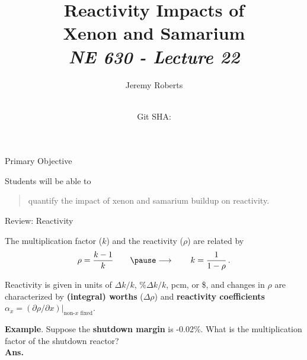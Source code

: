 \documentclass[aspectratio=1610]{beamer}
\title{Reactivity Impacts of \\Xenon and Samarium \\
       {\small\it NE 630 - Lecture 22}}
\date{ \\ {\footnotesize Git SHA: }}
\author{Jeremy Roberts}
\begin{document}
\begin{frame}
\titlepage
\end{frame}
 
 
\begin{frame}{Primary Objective}

Students will be able to 

\vfill

\begin{quote}
\textcolor{wcprimary}{quantify the impact of xenon and samarium buildup on reactivity.
}
\end{quote}

\vfill 

\end{frame}

\begin{frame}[fragile]{Review: Reactivity}
 
The multiplication factor ($k$) and the reactivity ($\rho$)
are related by
\begin{equation*}
  \rho = \frac{k - 1}{k} \qquad \pause \longrightarrow \qquad
  k =  \frac{1}{1-\rho} \, .
\end{equation*}

\vfill 
\pause 

Reactivity is given in units of $\Delta k/k$,  $\%\Delta k/k$, pcm, or \$,
and changes in $\rho$ are characterized by {\bf (integral) worths}  ($\Delta \rho$)
and {\bf reactivity coefficients} $\alpha_x = (\partial \rho/\partial x)|_{\text{non-}x\text{ fixed}}$.

\vfill 
\pause 

{\bf Example}. Suppose the {\bf shutdown margin} is -0.02\%.  What is the multiplication factor of the shutdown reactor?\\
{\small {\bf Ans.} }

\end{frame}
\end{document}
